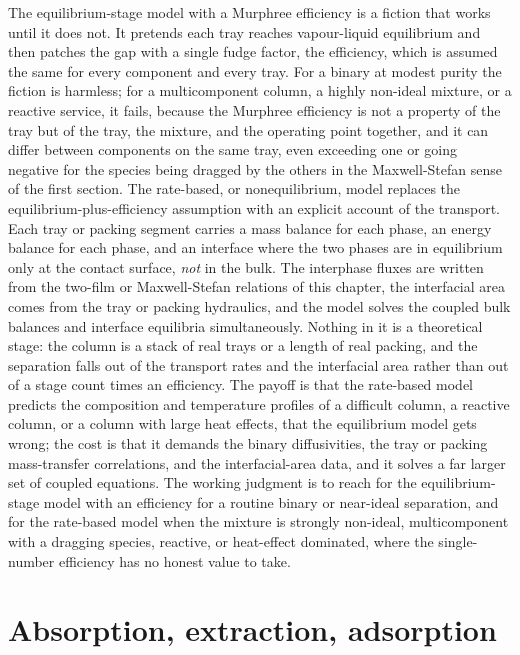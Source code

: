 \begin{mastery}
The equilibrium-stage model with a Murphree efficiency is a fiction that works
until it does not. It pretends each tray reaches vapour-liquid equilibrium and
then patches the gap with a single fudge factor, the efficiency, which is
assumed the same for every component and every tray. For a binary at modest
purity the fiction is harmless; for a multicomponent column, a highly
non-ideal mixture, or a reactive service, it fails, because the Murphree
efficiency is not a property of the tray but of the tray, the mixture, and the
operating point together, and it can differ between components on the same
tray, even exceeding one or going negative for the species being dragged by
the others in the Maxwell-Stefan sense of the first section. The rate-based, or
nonequilibrium, model replaces the equilibrium-plus-efficiency assumption with
an explicit account of the transport. Each tray or packing segment carries a
mass balance for each phase, an energy balance for each phase, and an
interface where the two phases are in equilibrium only at the contact surface,
\emph{not} in the bulk. The interphase fluxes are written from the two-film or
Maxwell-Stefan relations of this chapter, the interfacial area comes from the
tray or packing hydraulics, and the model solves the coupled bulk balances and
interface equilibria simultaneously. Nothing in it is a theoretical stage: the
column is a stack of real trays or a length of real packing, and the
separation falls out of the transport rates and the interfacial area rather
than out of a stage count times an efficiency. The payoff is that the
rate-based model predicts the composition and temperature profiles of a
difficult column, a reactive column, or a column with large heat effects, that
the equilibrium model gets wrong; the cost is that it demands the binary
diffusivities, the tray or packing mass-transfer correlations, and the
interfacial-area data, and it solves a far larger set of coupled equations.
The working judgment is to reach for the equilibrium-stage model with an
efficiency for a routine binary or near-ideal separation, and for the
rate-based model when the mixture is strongly non-ideal, multicomponent with a
dragging species, reactive, or heat-effect dominated, where the single-number
efficiency has no honest value to take.
\end{mastery}

\section{Absorption, extraction, adsorption}

